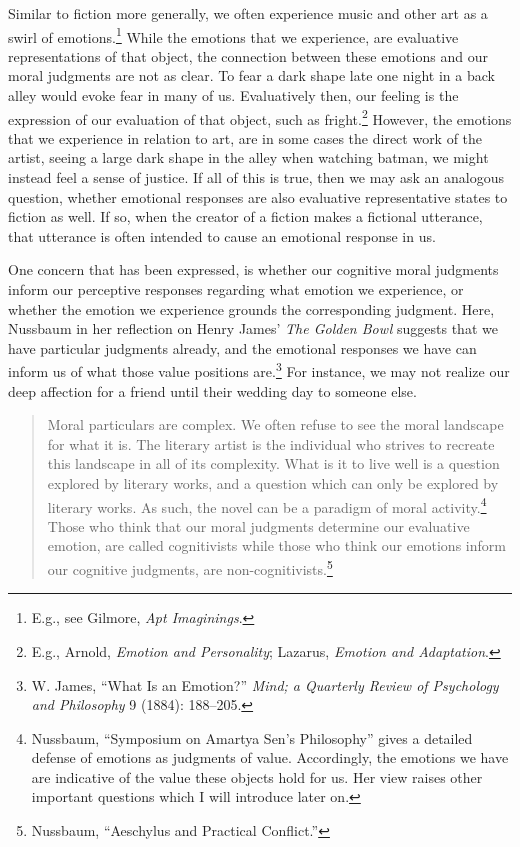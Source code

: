 \documentclass[phdthesis,12pt,final]{wuthesis}
\theoremstyle{definition}
\theoremstyle{definition}
\theoremstyle{definition}
\theoremstyle{definition}
\theoremstyle{remark}
\begin{document}
Similar to fiction more generally, we often experience music and other art as a swirl of emotions.\footnote{E.g., see Gilmore, \emph{Apt {Imaginings}}.} While the emotions that we experience, are evaluative representations of that object, the connection between these emotions and our moral judgments are not as clear. To fear a dark shape late one night in a back alley would evoke fear in many of us. Evaluatively then, our feeling is the expression of our evaluation of that object, such as fright.\footnote{E.g., Arnold, \emph{Emotion and {Personality}}; Lazarus, \emph{Emotion and Adaptation}.} However, the emotions that we experience in relation to art, are in some cases the direct work of the artist, seeing a large dark shape in the alley when watching batman, we might instead feel a sense of justice. If all of this is true, then we may ask an analogous question, whether emotional responses are also evaluative representative states to fiction as well. If so, when the creator of a fiction makes a fictional utterance, that utterance is often intended to cause an emotional response in us.

One concern that has been expressed, is whether our cognitive moral judgments inform our perceptive responses regarding what emotion we experience, or whether the emotion we experience grounds the corresponding judgment. Here, Nussbaum in her reflection on Henry James' \emph{The Golden Bowl} suggests that we have particular judgments already, and the emotional responses we have can inform us of what those value positions are.\footnote{W. James, {``What Is an Emotion?''} \emph{Mind; a Quarterly Review of Psychology and Philosophy} 9 (1884): 188--205.} For instance, we may not realize our deep affection for a friend until their wedding day to someone else.

\begin{quote}
Moral particulars are complex. We often refuse to see the moral landscape for what it is. The literary artist is the individual who strives to recreate this landscape in all of its complexity. What is it to live well is a question explored by literary works, and a question which can only be explored by literary works. As such, the novel can be a paradigm of moral activity.\footnote{Nussbaum, {``Symposium on {Amartya Sen}'s Philosophy''} gives a detailed defense of emotions as judgments of value. Accordingly, the emotions we have are indicative of the value these objects hold for us. Her view raises other important questions which I will introduce later on.} Those who think that our moral judgments determine our evaluative emotion, are called cognitivists while those who think our emotions inform our cognitive judgments, are non-cognitivists.\footnote{Nussbaum, {``Aeschylus and Practical Conflict.''}}
\end{quote}
\end{document}
